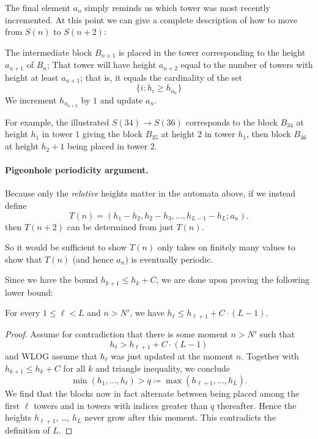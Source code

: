 \documentclass[11pt]{scrartcl}
\begin{document}
The final element $a_n$ simply reminds us which tower was most recently incremented.
At this point we can give a complete description of how to move from $S(n)$ to $S(n+2)$:
\begin{itemize}
  \ii The intermediate block $B_{n+1}$ is placed in the tower
  corresponding to the height $a_{n+1}$ of $B_n$;
  \ii That tower will have height $a_{n+2}$ equal to the number of towers
  with height at least $a_{n+1}$; that is, it equals the cardinality of the set
  \[ \{ i \colon h_i \ge h_{a_n} \} \]
  \ii We increment $h_{a_{n+2}}$ by $1$ and update $a_n$.
\end{itemize}

For example, the illustrated $S(34) \to S(36)$
corresponds to the block $B_{34}$ at height $h_1$ in tower $1$
giving the block $B_{35}$ at height $2$ in tower $h_1$,
then block $B_{36}$ at height $h_2 + 1$ being placed in tower $2$.


\paragraph{Pigeonhole periodicity argument.}
Because only the \emph{relative} heights matter in the automata above,
if we instead define
\[ T(n) = (h_1-h_2, h_2-h_3, \dots, h_{L-1}-h_L; a_n). \]
then $T(n+2)$ can be determined from just $T(n)$.

So it would be sufficient to show $T(n)$ only takes on finitely many values
to show that $T(n)$ (and hence $a_n$) is eventually periodic.

Since we have the bound $h_{k+1} \le h_k + C$,
we are done upon proving the following lower bound:
\begin{claim*}
  For every $1 \le \ell < L$ and $n > N'$,
  we have $h_\ell \le h_{\ell+1} + C \cdot (L-1)$.
\end{claim*}
\begin{proof}
  Assume for contradiction that there is some moment $n > N'$ such that
  \[ h_\ell > h_{\ell+1} + C \cdot (L-1) \]
  and WLOG assume that $h_\ell$ was just updated at the moment $n$.
  Together with $h_{k+1} \le h_k + C$ for all $k$ and triangle inequality, we conclude
  \[ \min(h_1, \dots, h_\ell) > q \coloneqq \max(h_{\ell+1}, \dots, h_L). \]
  We find that the blocks now in fact alternate between being placed
  among the first $\ell$ towers and in towers with indices greater than $q$ thereafter.
  Hence the heights $h_{\ell+1}$, \dots, $h_L$ never grow after this moment.
  This contradicts the definition of $L$.
\end{proof}
\end{document}
